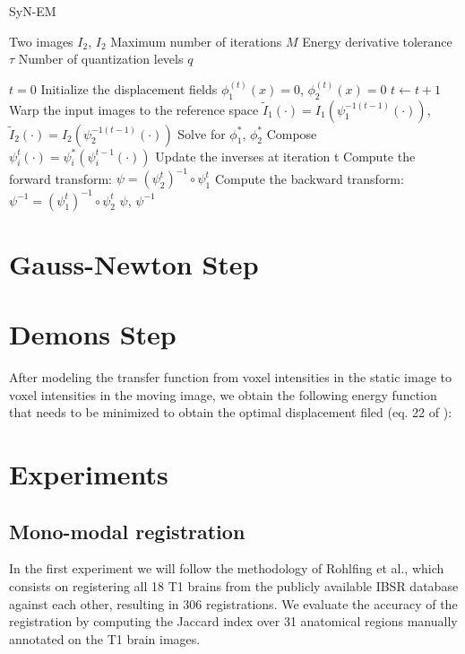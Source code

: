 \documentclass[11pt]{article}
\begin{document}
\begin{algorithm}[h!]
\caption{SyN-EM}\label{alg:SyNEM}
\begin{algorithmic}[1]
\REQUIRE Two images $I_{2}$, $I_{2}$
\REQUIRE Maximum number of iterations $M$
\REQUIRE Energy derivative tolerance $\tau$
\REQUIRE Number of quantization levels $q$

\medskip
\STATE $t = 0$
\STATE Initialize the displacement fields $\phi_{1}^{(t)}(x) = 0$, $\phi_{2}^{(t)}(x) = 0$
\REPEAT
    \STATE $t \leftarrow t+1$
    \STATE Warp the input images to the reference space $\tilde{I}_{1}(\cdot) = I_{1}(\psi_{1}^{-1(t-1)}(\cdot))$, $\tilde{I}_{2}(\cdot) = I_{2}(\psi_{2}^{-1(t-1)}(\cdot))$
    \STATE Solve for $\phi_{1}^{*}$, $\phi_{2}^{*}$
    \STATE Compose $\psi_{i}^{t}(\cdot) = \psi_{i}^{*}(\psi_{i}^{t-1}(\cdot))$
    \STATE Update the inverses at iteration t
\STATE Compute the forward transform: $\psi = (\psi_{2}^{t})^{-1} \circ \psi_{1}^{t}$
\STATE Compute the backward transform: $\psi^{-1} = (\psi_{1}^{t})^{-1} \circ \psi_{2}^{t}$
\RETURN $\psi$, $\psi^{-1}$
\end{algorithmic}
\end{algorithm}


\section{Gauss-Newton Step}

\section{Demons Step}
After modeling the transfer function from voxel intensities in the static image to voxel intensities in the moving image, we obtain the following energy function that needs to be minimized to obtain the optimal displacement filed (eq. 22 of \cite{Arce-santana2014}):

\section{Experiments}
\subsection{Mono-modal registration}

In the first experiment we will follow the methodology of Rohlfing et al.\cite{Rohlfing2012}, which consists on registering all 18 T1 brains from the publicly available IBSR database against each other, resulting in 306 registrations. We evaluate the accuracy of the registration by computing the Jaccard index over 31 anatomical regions manually annotated on the T1 brain images.
\end{document}
